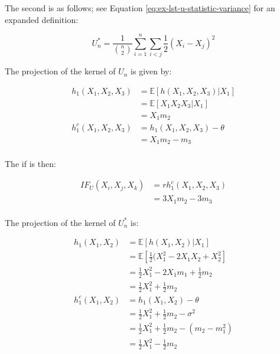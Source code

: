 \documentclass{report}
\begin{document}
The second is as follows; see Equation \ref{eq:ex-lst-u-statistic-variance} for an expanded definition:

\begin{equation}\label{eq:ex-lst-u-statistic-joint-variance}
    U_n^* = \frac{1}{\binom{n}{2}} \sum_{i=1}^n \sum_{i<j} \frac{1}{2}(X_i - X_j)^2
\end{equation}

The projection of the kernel of $U_n$ is given by:

\begin{equation}\label{eq:ex-lst-u-statistic-joint-m3-projection}
    \begin{aligned}
        h_1(X_1, X_2, X_3)
          &= \mathbb{E}[h(X_1, X_2, X_3) | X_1] \\
          &= \mathbb{E}[X_1X_2X_3 | X_1] \\
          &= X_1m_2 \\
        h_1^c(X_1, X_2, X_3)
          &= h_1(X_1, X_2, X_3) - \theta \\
          &= X_1m_2 - m_3 \\
    \end{aligned}
\end{equation}

The \gls{if} is then:

\begin{equation}\label{eq:ex-lst-u-statistic-joint-m3-if}
    \begin{aligned}
        IF_U(X_i, X_j, X_k)
          &= rh_1^c(X_1, X_2, X_3) \\
          &= 3X_1m_2 - 3m_3 \\
    \end{aligned}
\end{equation}

The projection of the kernel of $U_n^*$ is:

\begin{equation}\label{eq:ex-lst-u-statistic-joint-variance-projection}
    \begin{aligned}
        h_1(X_1, X_2)
          &= \mathbb{E}[h(X_1, X_2) | X_1] \\
          &= \mathbb{E}\left[\frac{1}{2}(X_1^2 - 2X_1X_2 + X_2^2\right] \\
          &= \frac{1}{2}X_1^2 - 2X_1m_1 + \frac{1}{2}m_2 \\
          &= \frac{1}{2}X_1^2 + \frac{1}{2}m_2 \\
        h_1^c(X_1, X_2)
          &= h_1(X_1, X_2) - \theta \\
          &= \frac{1}{2}X_1^2 + \frac{1}{2}m_2 - \sigma^2 \\
          &= \frac{1}{2}X_1^2 + \frac{1}{2}m_2 - (m_2 - m_1^2) \\
          &= \frac{1}{2}X_1^2 - \frac{1}{2}m_2 \\
    \end{aligned}
\end{equation}
\end{document}
